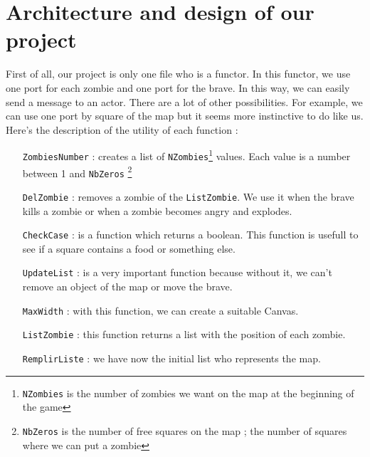 \section*{Architecture and design of our project}
First of all, our project is only one file who is a functor. In this functor, we use one port for each zombie and one port for the brave. In this way, we can easily send a message to an actor. There are a lot of other possibilities. For example, we can use one port by square of the map but it seems more instinctive to do like us.
\\

Here's the description of the utility of each function :
\\

\begin{itemize}
\item[\texttt{ZombiesNumber} :] creates a list of \texttt{NZombies}\footnote{\texttt{NZombies} is the number of zombies we want on the map at the beginning of the game} values. Each value is a number between 1 and \texttt{NbZeros} \footnote{\texttt{NbZeros} is the number of free squares on the map ; the number of squares where we can put a zombie}
\\

\item[\texttt{DelZombie} :] removes a zombie of the \texttt{ListZombie}. We use it when the brave kills a zombie or when a zombie becomes angry and explodes.
\\

\item[\texttt{CheckCase} :] is a function which returns a boolean. This function is usefull to see if a square contains a food or something else.
\\

\item[\texttt{UpdateList} :] is a very important function because without it, we can't remove an object of the map or move the brave.
\\

\item[\texttt{MaxWidth} :] with this function, we can create a suitable Canvas.
\\

\item[\texttt{ListZombie} :] this function returns a list with the position of each zombie.
\\

\item[\texttt{RemplirListe} :] we have now the initial list who represents the map.
\\


\end{itemize}
